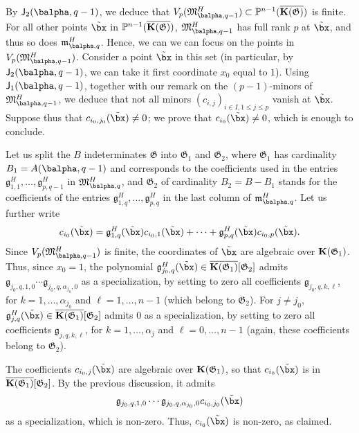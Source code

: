 \documentclass[12pt]{article}
\begin{document}
By $\assI_2(\balpha,q-1)$, we deduce that
$V_p(\mathfrak{M}^H_{\balpha,q-1}) \subset \P^{n-1}(\KKCbar)$ is
finite. For all other points $\tilde\bx$ in $\mathbb{P}^{n-1}(\overline{\mathbf{K}(\mathfrak{G})})$,
$\mathfrak{M}^H_{\balpha,q-1}$ has full rank $p$ at $\tilde\bx$, and
thus so does $\mathfrak{m}^H_{\balpha,q}$. Hence, we can we can focus
on the points in $V_p(\mathfrak{M}^H_{\balpha,q-1})$.  Consider a point
$\tilde\bx$ in this set (in particular, by $\assI_2(\balpha,q-1)$, we
can take it first coordinate $x_0$ equal to $1$). Using
$\assI_1(\balpha,q-1)$, together with our remark on the $(p-1)$-minors of
$\mathfrak{M}^H_{\balpha,q-1}$, we deduce that not all minors
$(c_{i,j})_{i \in I, 1 \le j \le p}$ vanish at
$\tilde\bx$. Suppose thus that $c_{i_0,j_0}(\tilde\bx) \ne 0$; we
prove that $c_{i_0}(\tilde\bx) \ne 0$, which is enough to conclude.

Let us split the $B$ indeterminates $\mathfrak{G}$ into
$\mathfrak{G}_1$ and $\mathfrak{G}_2$, where $\mathfrak{G}_1$ has
cardinality $B_1=A(\balpha,q-1)$ and corresponds to the coefficients
used in the entries
$\mathfrak{g}^H_{1,1},\dots,\mathfrak{g}^H_{p,q-1}$ in
$\mathfrak{M}^H_{\balpha,q}$, and $\mathfrak{G}_2$ of cardinality
$B_2=B-B_1$ stands for the coefficients of the entries
$\mathfrak{g}^H_{1,q},\dots,\mathfrak{g}^H_{p,q}$ in the last column
of $\mathfrak{m}^H_{\balpha,q}$.  Let us further
write $$c_{i_0}(\tilde\bx)= \mathfrak{g}^H_{1,q}(\tilde\bx)
c_{i_0,1}(\tilde\bx) + \cdots + \mathfrak{g}^H_{p,q}(\tilde\bx)
c_{i_0,p}(\tilde\bx).$$ Since $V_p(\mathfrak{M}^H_{\balpha,q-1})$ is
finite, the coordinates of $\tilde\bx$ are algebraic over
$\mathbf{K}(\mathfrak{G}_1)$.  Thus, since $x_0=1$, the polynomial
$\mathfrak{g}^H_{j_0,q}(\tilde\bx)\in
\overline{\KK(\mathfrak{G}_1)}[\mathfrak{G}_2]$ admits
$\mathfrak{g}_{j_0,q,1,0}\cdots \mathfrak{g}_{j_0,q,\alpha_{j_0},0}$ as a
specialization, by setting to zero all coefficients
$\mathfrak{g}_{j_0,q,k,\ell}$, for $k=1,\dots,\alpha_{j_0}$ and
$\ell=1,\dots,n-1$ (which belong to $\mathfrak{G}_2$).  For $j \ne
j_0$, $\mathfrak{g}^H_{j,q}(\tilde\bx)\in
\overline{\KK(\mathfrak{G}_1)}[\mathfrak{G}_2]$ admits $0$ as a
specialization, by setting to zero all coefficients
$\mathfrak{g}_{j,q,k,\ell}$, for $k=1,\dots,\alpha_j$ and
$\ell=0,\dots,n-1$ (again, these coefficients belong to $\mathfrak{G}_2$).

The coefficients $c_{i_0,j}(\tilde\bx)$ are algebraic over
$\mathbf{K}(\mathfrak{G}_1)$, so that $c_{i_0}(\tilde\bx)$ is in
$\overline{\mathbf{K}(\mathfrak{G}_1)}[\mathfrak{G}_2]$. By the previous 
discussion, it admits
$$ \mathfrak{g}_{j_0,q,1,0}\cdots \mathfrak{g}_{j_0,q,\alpha_{j_0},0} c_{i_0,j_0}(\tilde\bx)$$ as a
specialization, which is non-zero. Thus,  $c_{i_0}(\tilde\bx)$ 
is non-zero, as claimed.
\end{document}
